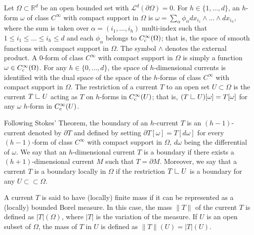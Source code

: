 \documentclass[11pt]{article}
\newcommand{\restr}{\ \rule{.4pt}{7pt}\rule{6pt}{.4pt}\ }
\begin{document}
Let $\Omega\subset\mathbb R^d$ be an open bounded set with $\mathcal L^d(\partial\Omega)=0$.   
For $h\in\{1,\dots, d\}$, an $h$-form $\omega$ of class $C^\infty$ with compact support in $\Omega$ is 
$\omega=\sum_{\alpha}\phi_\alpha dx_{i_1}\wedge\dots\wedge dx_{i_h}$, 
where the sum is taken over $\alpha=(i_1,\dots, i_h)$ multi-index such that $1\leq i_1\leq\dots\leq i_h\leq d$ and each $\phi_\alpha$ belongs to $C^\infty_{\rm c}(\Omega)$; that is, the space of smooth functions with compact support in $\Omega$.  
The symbol $\wedge$ denotes the external product. 
A $0$-form of class $C^\infty$ with compact support in $\Omega$ is simply a function $\omega\in C^{\infty}_{\rm c}(\Omega)$.
For any $h\in\{0,\dots, d\}$, 
the space 
of $h$-dimensional currents 
is identified with the dual space of the space of the $h$-forms of class $C^\infty$ with compact support in $\Omega$. 
The restriction of a current $T
$ to an open set $U\subset\Omega$ is the current $T\restr U$ acting as $T$ on $h$-forms in $C^\infty_{\rm c}(U)$; that is, $(T\restr U)[\omega]=T[\omega]$ for any $\omega$ $h$-form in $C^\infty_{\rm c}(U)$. 

Following Stokes' Theorem, the boundary of an $h$-current $T$ is an $(h-1)$-current denoted by $\partial T$ and defined by setting 
$\partial T[\omega]=T[d\omega]$ for every $(h-1)$-form of class $C^\infty$ with compact support in $\Omega$, $d\omega$ being the differential of $\omega$.  
We say that an $h$-dimensional current $T$ is a boundary if there exists a $(h+1)$-dimensional current $M$ such that $T=\partial M$.
Moreover, we say that a current $T$ is a boundary locally in $\Omega$ 
if the restriction $T\restr U$ 
is a boundary for any $U\subset\subset\Omega$.  

A current $T$ is said to have (locally) finite mass
if it can be represented as a (locally) bounded Borel measure. 
In this case, the mass $\|T\|$ of the current $T$ is defined as $|T|(\Omega)$, where $|T|$ is 
the variation of the measure. If $U$ is an open subset of $\Omega$, the mass 
of $T$ in $U$ is defined as $\|T\|(U)=|T|(U)$. 
\end{document}
